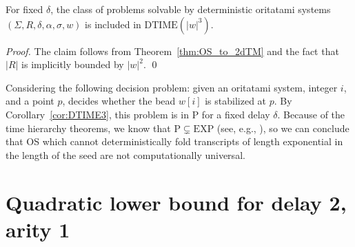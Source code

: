 \documentclass[runningheads]{llncs}
\begin{document}
\begin{corollary}\label{cor:DTIME3}
	For fixed $\delta$, the class of problems solvable by deterministic oritatami systems $(\Sigma, R, \delta, \alpha, \sigma, w)$ is included in $\mathrm{DTIME}(|w|^3)$.
\end{corollary}
\begin{proof}
	The claim follows from Theorem~\ref{thm:OS_to_2dTM} and the fact that $|R|$ is implicitly bounded by $|w|^2$.
	\qed
\end{proof}



Considering the following decision problem: given an oritatami system, integer $i$, and a point $p$, decides whether the bead $w[i]$ is stabilized at $p$. 
By Corollary~\ref{cor:DTIME3}, this problem is in $\mathrm{P}$ for a fixed delay $\delta$.
Because of the time hierarchy theorems, we know that $\mathrm{P}\subsetneq \mathrm{EXP}$ (see, e.g., \cite{AroraBarak2009}), so we can conclude that OS which cannot deterministically fold transcripts of length exponential in the length of the seed are not computationally universal.


\section{Quadratic lower bound for delay 2, arity 1}\label{sect:lower}





%


\end{document}
